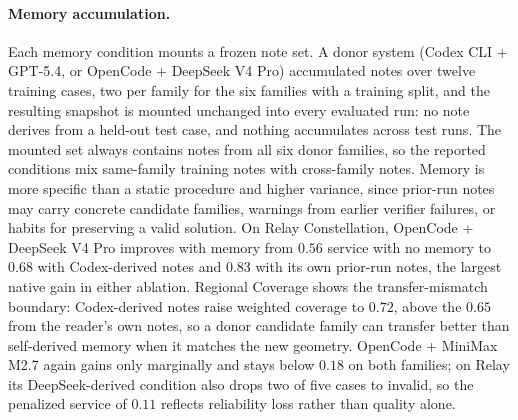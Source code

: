 \documentclass[]{mosi}
\begin{document}
\paragraph{Memory accumulation.}
Each memory condition mounts a frozen note set. A donor system (Codex CLI + GPT-5.4, or OpenCode + DeepSeek V4 Pro) accumulated notes over twelve training cases, two per family for the six families with a training split, and the resulting snapshot is mounted unchanged into every evaluated run: no note derives from a held-out test case, and nothing accumulates across test runs. The mounted set always contains notes from all six donor families, so the reported conditions mix same-family training notes with cross-family notes. Memory is more specific than a static procedure and higher variance, since prior-run notes may carry concrete candidate families, warnings from earlier verifier failures, or habits for preserving a valid solution. On Relay Constellation, OpenCode + DeepSeek V4 Pro improves with memory from $0.56$ service with no memory to $0.68$ with Codex-derived notes and $0.83$ with its own prior-run notes, the largest native gain in either ablation. Regional Coverage shows the transfer-mismatch boundary: Codex-derived notes raise weighted coverage to $0.72$, above the $0.65$ from the reader's own notes, so a donor candidate family can transfer better than self-derived memory when it matches the new geometry. OpenCode + MiniMax M2.7 again gains only marginally and stays below $0.18$ on both families; on Relay its DeepSeek-derived condition also drops two of five cases to invalid, so the penalized service of $0.11$ reflects reliability loss rather than quality alone.
\end{document}
